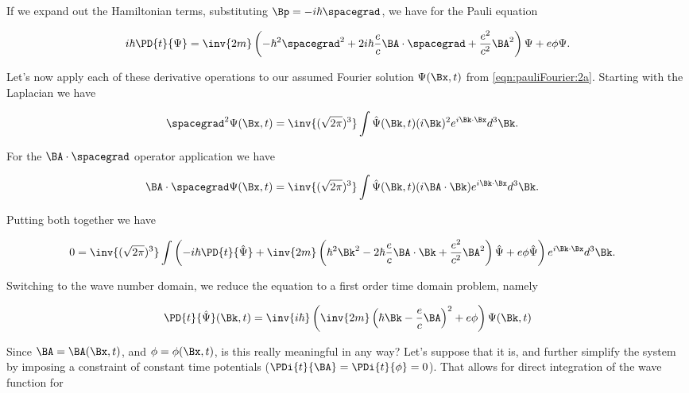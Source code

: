 If we expand out the Hamiltonian terms, substituting $\Bp = -i \hbar \spacegrad$, we have for the Pauli equation

\begin{align}\label{eqn:pauliFourier:3}
i \hbar \PD{t}{\Psi} = \inv{2m} \left( - \hbar^2 \spacegrad^2 + 2 i \hbar \frac{e}{c} \BA \cdot \spacegrad + \frac{e^2}{c^2} \BA^2 \right) \Psi + e \phi \Psi.
\end{align}

Let's now apply each of these derivative operations to our assumed Fourier solution $\Psi(\Bx, t)$ from \ref{eqn:pauliFourier:2a}.  Starting with the Laplacian we have

\begin{align}\label{eqn:pauliFourier:xx1}
\spacegrad^2 \Psi(\Bx, t) &=
\inv{(\sqrt{2 \pi})^3} \int \hat{\Psi}(\Bk, t) (i\Bk)^2 e^{i \Bk \cdot \Bx} d^3 \Bk.
\end{align}

For the $\BA \cdot \spacegrad$ operator application we have

\begin{align}\label{eqn:pauliFourier:xx2}
\BA \cdot \spacegrad \Psi(\Bx, t) &=
\inv{(\sqrt{2 \pi})^3} \int \hat{\Psi}(\Bk, t) (i \BA \cdot \Bk) e^{i \Bk \cdot \Bx} d^3 \Bk.
\end{align}

Putting both together we have

\begin{align}\label{eqn:pauliFourier:5}
0 &= 
\inv{(\sqrt{2 \pi})^3} \int 
\left(
-i \hbar \PD{t}{\hat{\Psi}} + \inv{2m} \left( \hbar^2 \Bk^2 - 2 \hbar \frac{e}{c} \BA \cdot \Bk + \frac{e^2}{c^2} \BA^2 \right) \hat{\Psi} + e \phi \hat{\Psi} \right)
e^{i \Bk \cdot \Bx} d^3 \Bk.
\end{align}

Switching to the wave number domain, we reduce the equation to a first order time domain problem, namely

\begin{align}\label{eqn:pauliFourier:6}
\PD{t}{\hat{\Psi}}(\Bk, t) = \inv{i \hbar} \left( \inv{2m} \left( \hbar \Bk - \frac{e}{c} \BA \right)^2 + e \phi \right) \Psi(\Bk, t)
\end{align}

Since $\BA = \BA(\Bx, t)$, and $\phi = \phi(\Bx, t)$, is this really meaningful in any way?  Let's suppose that it is, and further simplify the system by imposing a constraint of constant time potentials ($\PDi{t}{\BA} = \PDi{t}{\phi} = 0$).  That allows for direct integration of the wave function for

